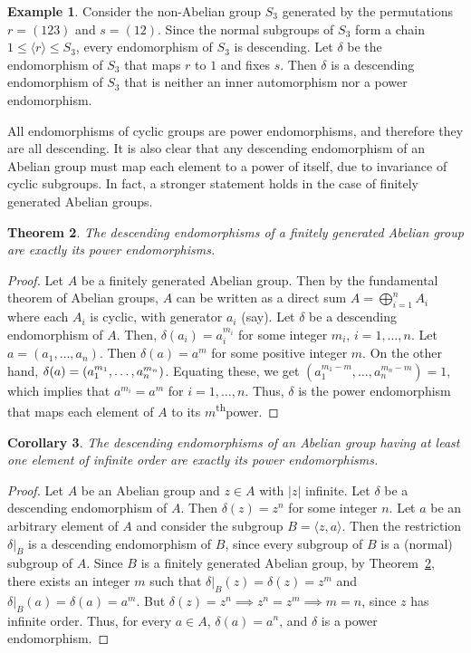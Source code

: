 \documentclass[11pt, a4paper]{article}
\newcommand{\nth}{\textsuperscript{th}}
\newtheorem{Theorem}{Theorem}[section]
\newtheorem{Corollary}[Theorem]{Corollary}
\theoremstyle{definition}
\newtheorem{Example}[Theorem]{Example}
\begin{document}
\begin{Example}\label{ex:DescEndS3}
Consider the non-Abelian group $S_3$ generated by the permutations $r = (123)$ and $s = (12)$.  Since the normal subgroups of $S_3$ form a chain $1 \le \langle r \rangle \le S_3$, every endomorphism of $S_3$ is descending. Let $\delta$ be the endomorphism of $S_3$ that maps $r$ to $1$ and fixes $s$. Then $\delta$ is a descending endomorphism of $S_3$ that is neither an inner automorphism nor a power endomorphism.
\end{Example}

All endomorphisms of cyclic groups are power endomorphisms, and therefore they are all descending. It is also clear that any descending endomorphism of an Abelian group must map each element to a power of itself, due to invariance of cyclic subgroups. In fact, a stronger statement holds in the case of finitely generated Abelian groups.

\begin{Theorem}\label{thm:FGADescEnd}
The descending endomorphisms of a finitely generated Abelian group are exactly its power endomorphisms.
\end{Theorem}

\begin{proof}
Let $A$ be a finitely generated Abelian group. Then by the fundamental theorem of Abelian groups, $A$ can be written as a direct sum $A = \bigoplus\limits_{i = 1}^n A_i$ where each $A_i$ is cyclic, with generator $a_i$ (say). Let $\delta$ be a descending endomorphism of $A$. Then, $\delta(a_i) = a_i^{m_i}$ for some integer $m_i$, $i = 1, \ldots, n$. Let $a = (a_1, \ldots, a_n)$. Then $\delta(a) = a^m$ for some positive integer $m$. On the other hand, $\delta(a) = \pqty{a_1^{m_1}, \ldots, a_n^{m_n}}$. Equating these, we get $(a_1^{m_1 - m}, \ldots, a_n^{m_n - m}) = 1$, which implies that $a^{m_i} = a^m$ for $i = 1, \ldots, n$. Thus, $\delta$ is the power endomorphism that maps each element of $A$ to its $m$\nth power.
\end{proof}

\begin{Corollary}\label{cor:NTADescEnd}
The descending endomorphisms of an Abelian group having at least one element of infinite order are exactly its power endomorphisms.
\end{Corollary}
\begin{proof}
Let $A$ be an Abelian group and $z \in A$ with $|z|$ infinite. Let $\delta$ be a descending endomorphism of $A$. Then $\delta(z) = z^n$ for some integer $n$. Let $a$ be an arbitrary element of $A$ and consider the subgroup $B = \langle z, a\rangle$. Then the restriction $\delta|_B$ is a descending endomorphism of $B$, since every subgroup of $B$ is a (normal) subgroup of $A$. Since $B$ is a finitely generated Abelian group, by Theorem~\ref{thm:FGADescEnd}, there exists an integer $m$ such that $\delta|_B(z) = \delta(z) = z^m$ and $\delta|_B(a) = \delta(a) = a^m$. But $\delta(z) = z^n \implies z^n = z^m \implies m = n$, since $z$ has infinite order. Thus, for every $a \in A$, $\delta(a) = a^n$, and $\delta$ is a power endomorphism.
\end{proof}
\end{document}
